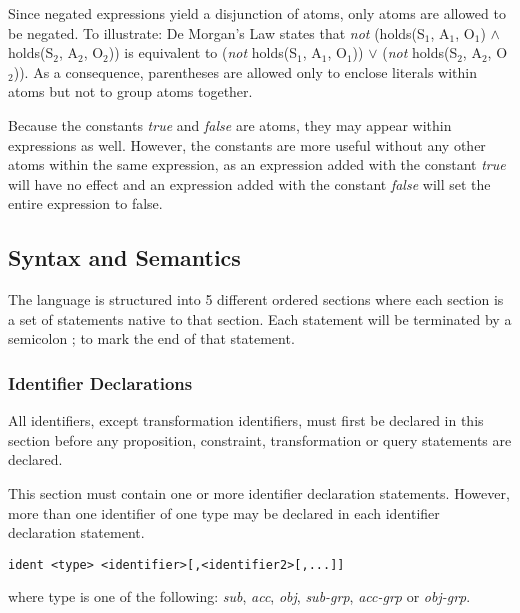 \documentclass[a4paper]{article}
\begin{document}
        Since negated expressions yield a disjunction of atoms, only
        atoms are allowed to be negated. To illustrate: De Morgan's Law
        states that \emph{not} (holds(S$_{1}$, A$_{1}$, O$_{1}$) $\land$
        holds(S$_{2}$, A$_{2}$, O$_{2}$)) is equivalent to (\emph{not} 
        holds(S$_{1}$, A$_{1}$, O$_{1}$)) $\lor$ (\emph{not} holds(S$_{2}$, 
        A$_{2}$, O$_{2}$)). As a consequence, parentheses are allowed only
        to enclose literals within atoms but not to group atoms together. 

        Because the constants \emph{true} and \emph{false} are atoms, they may 
        appear within expressions as well. However, the constants are more
        useful without any other atoms within the same expression, as an
        expression added with the constant \emph{true} will have no effect
        and an expression added with the constant \emph{false} will set the
        entire expression to false.

    \subsection{Syntax and Semantics}

      The language is structured into 5 different ordered sections where each
      section is a set of statements native to that section.  Each statement
      will be terminated by a semicolon ; to mark the end of that statement.

      \subsubsection{Identifier Declarations}

        All identifiers, except transformation identifiers, must first be 
        declared in this section before any proposition, constraint, 
        transformation or query statements are declared.

        This section must contain one or more identifier declaration
        statements. However, more than one identifier of one type may be 
        declared in each identifier declaration statement.

\begin{verbatim}
ident <type> <identifier>[,<identifier2>[,...]]
\end{verbatim}

        where type is one of the following: \emph{sub}, \emph{acc}, \emph{obj},
        \emph{sub-grp}, \emph{acc-grp} or \emph{obj-grp}.
\end{document}
